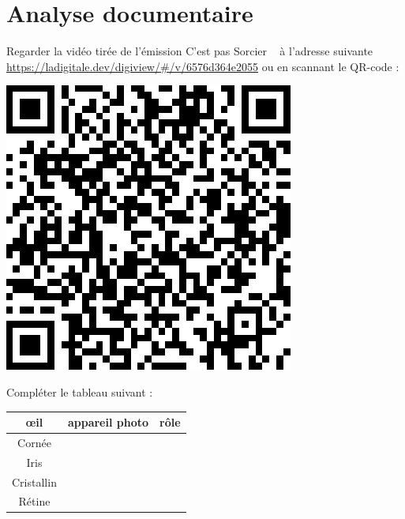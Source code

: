 \section{Analyse documentaire}
\begin{tcolorbox}[colback=orange!5!white,colframe=orange!75!black,title= C'est pas sorcier l'\oe il ! :]
Regarder la vidéo tirée de l'émission \og C'est pas Sorcier \fg~ à l'adresse suivante \url{https://ladigitale.dev/digiview/#/v/6576d364e2055} ou en scannant le QR-code : 
\begin{center}
    \includegraphics[scale=0.4]{Images/CPasSorcier_Oeil.png}
\end{center}
Compléter le tableau suivant :
\begin{center}
    \begin{tabular}{|C{0.3}|C{0.3}|C{0.3}|}
    \hline
         \oe il &  appareil photo &  rôle \\
        \hline
        Cornée & %
        & %
        \\
        \hline
        Iris & %
        & %
        \\
        \hline 
        Cristallin & %
        &%
        \\
        \hline 
        Rétine & %
        & %
        \\
        \hline 
    \end{tabular}
\end{center}

\end{tcolorbox}


